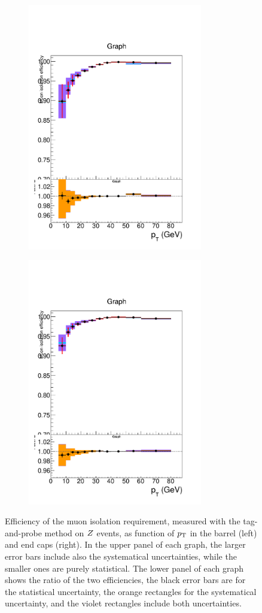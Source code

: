 \begin{figure}[tbh]
\centering
\begin{subfigure}{0.45\textwidth}
\centering
\includegraphics[width=3in]{Figures/Muons/mu_iso_barrel.pdf}
\caption{}
\end{subfigure}
\begin{subfigure}{0.45\textwidth}
\centering
\includegraphics[width=3in]{Figures/Muons/mu_iso_endcap.pdf}
\caption{}
\end{subfigure}
    \caption{Efficiency of the muon isolation requirement, measured with the tag-and-probe method on $Z$ events, as function of $p_{\rm{T}}$ in the barrel (left) and end caps (right). In the upper panel of each graph, the larger error bars include also the systematical uncertainties, while the smaller ones are purely statistical. The lower panel of each graph shows the ratio of the two efficiencies, the black error bars are for the statistical uncertainty, the orange rectangles for the systematical uncertainty, and the violet rectangles include both uncertainties.}
\label{fig:MuonIDEff_3}
\end{figure}

